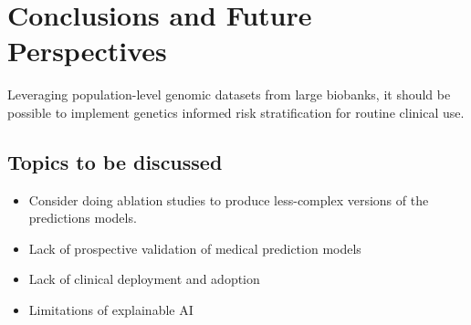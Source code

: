 \chapter{Conclusions and Future Perspectives}
\label{conclusions}



Leveraging population-level genomic datasets from large biobanks,
it should be possible to implement genetics informed risk stratification
for routine clinical use.


\section{Topics to be discussed}
\begin{itemize}
    \item Consider doing ablation studies to produce less-complex versions
        of the predictions models.
    \item Lack of prospective validation of medical prediction models
    \item Lack of clinical deployment and adoption 
    \item Limitations of explainable AI
\end{itemize}


